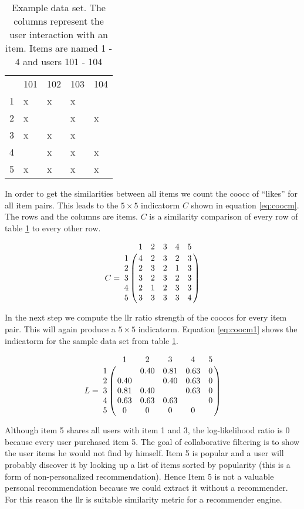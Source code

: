 \begin{table}
\begin{center}
\begin{tabular}{rllll}
 & 101 & 102 & 103 & 104\\
1 & x & x & x &  \\
2 & x &   & x & x\\
3 & x & x & x &  \\
4 &   & x & x & x\\
5 & x & x & x & x\\
\end{tabular}
\end{center}
\caption{Example data set. The columns represent the user interaction with an item. Items are named 1 - 4 and users 101 - 104}
\label{tbl:llr1}
\end{table}

In order to get the similarities between all items we count the \gls{coocc} of ``\glspl{like}'' for all item pairs. This leads to the $5 \times 5$ \gls{indicatorm} $C$ shown in equation \ref{eq:coocm}. The rows and the columns are items. $C$ is a similarity comparison of every row of table \ref{tbl:llr1} to every other row.

\begin{equation}
  \label{eq:coocm}
C =\bordermatrix{~ & 1 & 2 & 3 & 4 & 5 \cr
1 & 4 & 2 & 3 & 2 & 3 \cr
2 & 2 & 3 & 2 & 1 & 3 \cr
3 & 3 & 2 & 3 & 2 & 3 \cr
4 & 2 & 1 & 2 & 3 & 3 \cr
5 & 3 & 3 & 3 & 3 & 4 \cr}
\end{equation}

In the next step we compute the \gls{llr} ratio strength of the \glspl{coocc} for every item pair. This will again produce a $5 \times 5$ \gls{indicatorm}. Equation \ref{eq:coocm1} shows the \gls{indicatorm} for the sample data set from table \ref{tbl:llr1}.

\begin{equation}
  \label{eq:coocm1}
L =\bordermatrix{~ & 1 & 2 & 3 & 4 & 5 \cr
1 &   & 0.40 & 0.81 & 0.63 & 0 \cr
2 & 0.40 &  & 0.40 & 0.63 & 0 \cr
3 & 0.81 & 0.40 &  & 0.63 & 0 \cr
4 & 0.63 & 0.63 & 0.63 &  & 0 \cr
5 & 0 & 0 & 0 & 0 & \cr
}
\end{equation}

Although item 5 shares all users with item 1 and 3, the log-likelihood ratio is 0 because every user purchased item 5. The goal of collaborative filtering is to show the user items he would not find by himself. Item 5 is popular and a user will probably discover it by looking up a list of items sorted by popularity (this is a form of non-personalized recommendation). Hence Item 5 is not a valuable personal recommendation because we could extract it without a recommender. For this reason the \gls{llr} is suitable similarity metric for a recommender engine.

